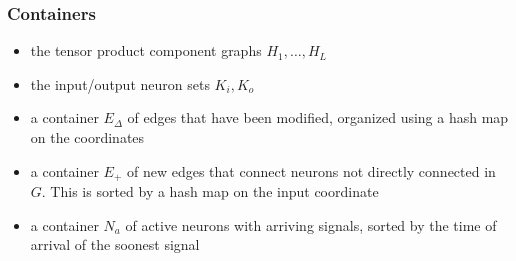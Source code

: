 \documentclass{article}
\begin{document}
\subsubsection{Containers}
\begin{itemize}
    \item the tensor product component graphs $H_1, \ldots, H_L$
    \item the input/output neuron sets $K_i, K_o$
    \item a container $E_\Delta$ of edges that have been modified, organized using a hash map on the coordinates
    \item a container $E_+$ of new edges that connect neurons not directly connected in $G$. This is sorted by a hash map on the input coordinate
    \item a container $N_a$ of active neurons with arriving signals, sorted by the time of arrival of the soonest signal
\end{itemize}


\newpage
\end{document}
